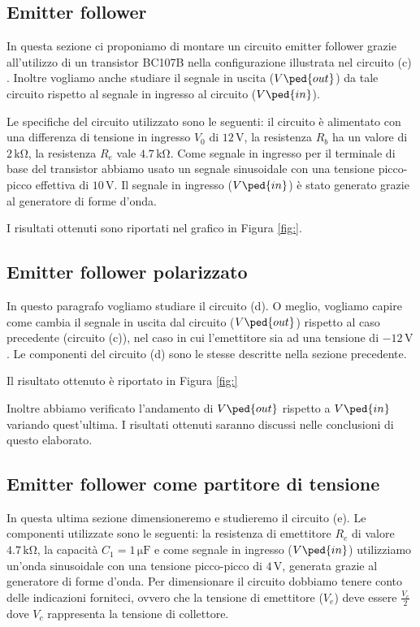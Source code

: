 \subsection*{Emitter follower}

In questa sezione ci proponiamo di montare un circuito emitter follower grazie all'utilizzo di un transistor BC107B nella configurazione illustrata nel circuito (c) . Inoltre vogliamo anche studiare il segnale in uscita ($V\ped{out}$) da tale circuito rispetto al segnale in ingresso al circuito ($V\ped{in}$).

Le specifiche del circuito utilizzato sono le seguenti: il circuito è alimentato con una differenza di tensione in ingresso $V_0$ di $12\,\si{\volt}$, la resistenza $R_b$ ha un valore di $2\,\si{\kilo\ohm}$, la resistenza $R_e$ vale $4.7\,\si{\kilo\ohm}$. Come segnale in ingresso per il terminale di base del transistor abbiamo usato un segnale sinusoidale con una tensione picco-picco effettiva di $10\,\si{\volt}$. Il segnale in ingresso ($V\ped{in}$) è stato generato grazie al generatore di forme d'onda.

I risultati ottenuti sono riportati nel grafico in Figura \ref{fig:}.

\subsection*{Emitter follower polarizzato}

In questo paragrafo vogliamo studiare il circuito (d). O meglio, vogliamo capire come cambia il segnale in uscita dal circuito ($V\ped{out}$) rispetto al caso precedente (circuito (c)), nel caso in cui l'emettitore sia ad una tensione di $-12\,\si{\volt}$.
Le componenti del circuito (d) sono le stesse descritte nella sezione precedente.

Il risultato ottenuto è riportato in Figura \ref{fig:}

Inoltre abbiamo verificato l'andamento di $V\ped{out}$ rispetto a $V\ped{in}$ variando quest'ultima. I risultati ottenuti saranno discussi nelle conclusioni di questo elaborato.

\subsection*{Emitter follower come partitore di tensione}

In questa ultima sezione dimensioneremo e studieremo il circuito (e). Le componenti utilizzate sono le seguenti: la resistenza di emettitore $R_e$ di valore $4.7\,\si{\kilo\ohm}$, la capacità $C_1=1\,\si{\micro\farad}$ e come segnale in ingresso ($V\ped{in}$) utilizziamo un'onda sinusoidale con una tensione picco-picco di $4\,\si{\volt}$, generata grazie al generatore di forme d'onda.
Per dimensionare il circuito dobbiamo tenere conto delle indicazioni forniteci, ovvero che la tensione di emettitore ($V_e$) deve essere $\frac{V_c}{2}$ dove $V_c$ rappresenta la tensione di collettore.

